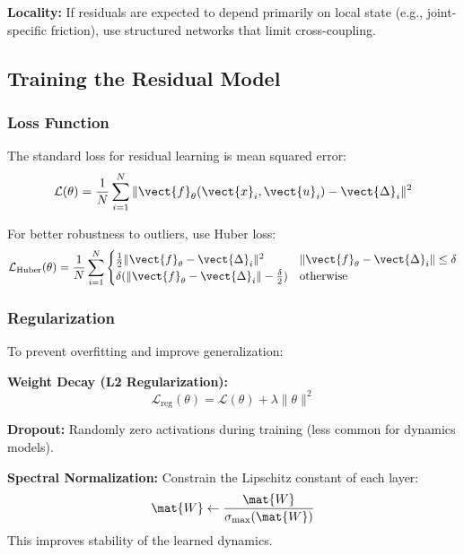 \textbf{Locality:}
If residuals are expected to depend primarily on local state (e.g., joint-specific friction), use structured networks that limit cross-coupling.

\subsection{Training the Residual Model}

\subsubsection{Loss Function}

The standard loss for residual learning is mean squared error:
\begin{equation}
\mathcal{L}(\theta) = \frac{1}{N} \sum_{i=1}^{N} \|\vect{f}_\theta(\vect{x}_i, \vect{u}_i) - \vect{\Delta}_i\|^2
\label{eq:mse_loss}
\end{equation}

For better robustness to outliers, use Huber loss:
\begin{equation}
\mathcal{L}_{\text{Huber}}(\theta) = \frac{1}{N} \sum_{i=1}^{N} \begin{cases}
\frac{1}{2}\|\vect{f}_\theta - \vect{\Delta}_i\|^2 & \|\vect{f}_\theta - \vect{\Delta}_i\| \leq \delta \\
\delta(\|\vect{f}_\theta - \vect{\Delta}_i\| - \frac{\delta}{2}) & \text{otherwise}
\end{cases}
\label{eq:huber_loss}
\end{equation}

\subsubsection{Regularization}

To prevent overfitting and improve generalization:

\textbf{Weight Decay (L2 Regularization):}
\begin{equation}
\mathcal{L}_{\text{reg}}(\theta) = \mathcal{L}(\theta) + \lambda \|\theta\|^2
\end{equation}

\textbf{Dropout:} Randomly zero activations during training (less common for dynamics models).

\textbf{Spectral Normalization:} Constrain the Lipschitz constant of each layer:
\begin{equation}
\mat{W} \leftarrow \frac{\mat{W}}{\sigma_{\max}(\mat{W})}
\end{equation}
This improves stability of the learned dynamics.

